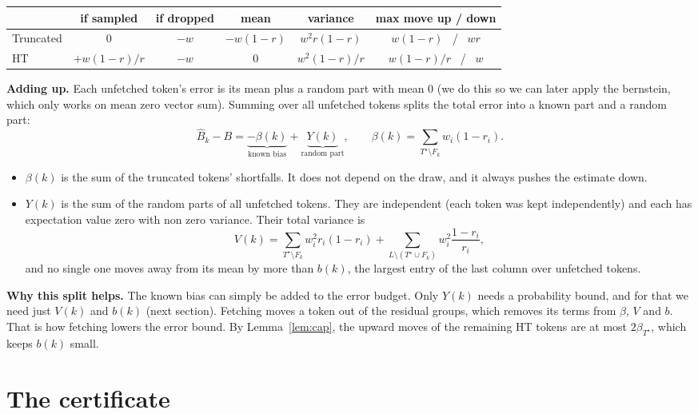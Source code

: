\documentclass[11pt]{article}
\theoremstyle{definition}
\theoremstyle{remark}
\begin{document}
\begin{center}
\begin{tabular}{lccccc}\toprule
 & if sampled & if dropped & mean & variance & max move up / down \\ \midrule
Truncated & $0$ & $-w$ & $-w(1-r)$ & $w^2 r(1-r)$ & $w(1-r)$ \ / \ $wr$ \\
HT & $+w(1-r)/r$ & $-w$ & $0$ & $w^2(1-r)/r$ & $w(1-r)/r$ \ / \ $w$ \\ \bottomrule
\end{tabular}
\end{center}

\textbf{Adding up.} Each unfetched token's error is its mean plus a random part with mean 0 (we do this so we can later apply
the bernstein, which only works on mean zero vector sum). Summing over all unfetched tokens splits the total error into a
known part and a random part:
\begin{equation}\label{eq:split}
\hat B_k - B = \underbrace{-\beta(k)}_{\text{known bias}} + \underbrace{Y(k)}_{\text{random part}}, \qquad
\beta(k) = \sum_{T^\star \setminus F_k} w_i (1 - r_i).
\end{equation}
\begin{itemize}
\item $\beta(k)$ is the sum of the truncated tokens' shortfalls. It does not depend on the draw, and it always pushes the
estimate down.
\item $Y(k)$ is the sum of the random parts of all unfetched tokens. They are independent (each token was kept
independently) and each has expectation value zero with non zero variance. Their total variance is
\[ V(k) = \sum_{T^\star \setminus F_k} w_i^2 r_i(1 - r_i) + \sum_{L \setminus (T^\star \cup F_k)} w_i^2 \frac{1 - r_i}{r_i}, \]
and no single one moves away from its mean by more than $b(k)$, the largest entry of the last column over unfetched tokens.
\end{itemize}

\textbf{Why this split helps.} The known bias can simply be added to the error budget. Only $Y(k)$ needs a probability
bound, and for that we need just $V(k)$ and $b(k)$ (next section). Fetching moves a token out of the residual groups, which
removes its terms from $\beta$, $V$ and $b$. That is how fetching lowers the error bound. By Lemma~\ref{lem:cap}, the upward
moves of the remaining HT tokens are at most $2\beta_{T^\star}$, which keeps $b(k)$ small.

\section{The certificate}\label{sec:cert}
\end{document}
